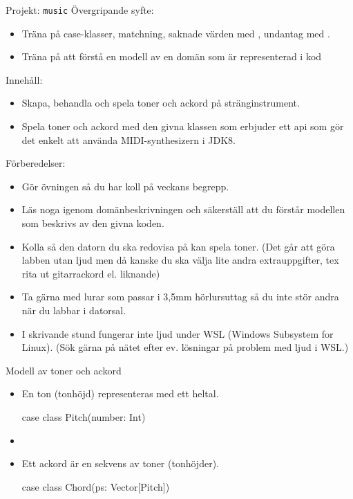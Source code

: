 
\begin{Slide}{Projekt: \texttt{music}}\SlideFontSmall
Övergripande syfte:
\begin{itemize}
\item Träna på case-klasser, matchning, saknade värden med , undantag med .
\item Träna på att förstå en modell av en domän som är representerad i kod
\end{itemize}

Innehåll:
\begin{itemize}
\item Skapa, behandla och spela toner och ackord på stränginstrument.
\item Spela toner och ackord med den givna klassen  som erbjuder ett api som gör det enkelt att använda MIDI-synthesizern i JDK8.
\end{itemize}

Förberedelser:
\begin{itemize}
  \item Gör övningen så du har koll på veckans begrepp.
  \item Läs noga igenom domänbeskrivningen och säkerställ att du förstår modellen som beskrivs av den givna koden.
  \item Kolla så den datorn du ska redovisa på kan spela toner. (Det går att göra labben utan ljud men då kanske du ska välja lite andra extrauppgifter, tex rita ut gitarrackord el. liknande)
  \item Ta gärna med lurar som passar i 3,5mm hörlursuttag så du inte stör andra när du labbar i datorsal.
  \item I skrivande stund fungerar inte ljud under WSL (Windows Subsystem for Linux). (Sök gärna på nätet efter ev. lösningar på problem med ljud i WSL.)
\end{itemize}

\end{Slide}


\begin{Slide}{Modell av toner och ackord}

\begin{itemize}
\item En ton (tonhöjd) representeras med ett heltal.
\begin{Code}
case class Pitch(number: Int)
\end{Code}

\item[]

\item Ett ackord är en sekvens av toner (tonhöjder).
\begin{Code}
case class Chord(ps: Vector[Pitch])
\end{Code}
\end{itemize}

\end{Slide}


